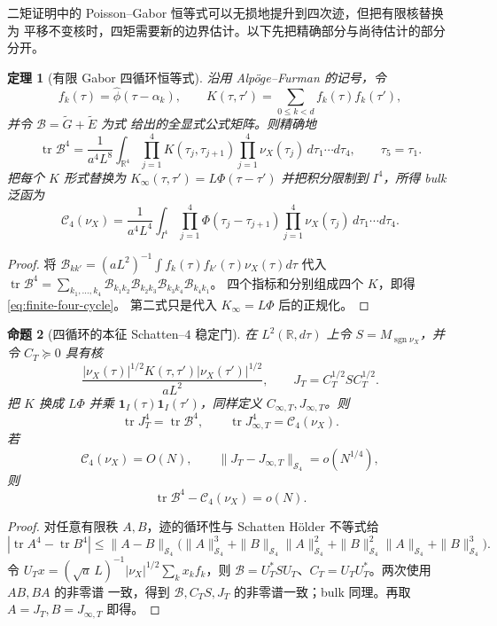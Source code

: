 \documentclass[UTF8,11pt,a4paper]{ctexart}
\newtheorem{theorem}{定理}[section]
\newtheorem{proposition}[theorem]{命题}
\theoremstyle{definition}
\theoremstyle{remark}
\newcommand{\tr}{\operatorname{tr}}
\begin{document}
二矩证明中的 Poisson--Gabor 恒等式可以无损地提升到四次迹，但把有限核替换为
平移不变核时，四矩需要新的边界估计。以下先把精确部分与尚待估计的部分分开。

\begin{theorem}[有限 Gabor 四循环恒等式]\label{thm:gabor-four-cycle}
沿用 Alpöge--Furman \cite[\S2]{AF26} 的记号，令
\[
 f_k(\tau)=\widehat\phi(\tau-\alpha_k),\qquad
 K(\tau,\tau')=\sum_{0\le k<d}f_k(\tau)f_k(\tau'),
\]
并令 $\mathcal B=\widetilde G+\widetilde E$ 为式 \cite[(2.11)]{AF26}
给出的全显式公式矩阵。则精确地
\[
 \tr\mathcal B^4
 =\frac1{a^4L^8}\int_{\mathbb R^4}
 \prod_{j=1}^4K(\tau_j,\tau_{j+1})
 \prod_{j=1}^4\nu_X(\tau_j)\,d\tau_1\cdots d\tau_4,
 \qquad \tau_5=\tau_1.
 \label{eq:finite-four-cycle}
\]
把每个 $K$ 形式替换为
$K_\infty(\tau,\tau')=L\Phi(\tau-\tau')$ 并把积分限制到
$I^4$，所得 bulk 泛函为
\[
 \mathcal C_4(\nu_X)
 =\frac1{a^4L^4}\int_{I^4}
 \prod_{j=1}^4\Phi(\tau_j-\tau_{j+1})
 \prod_{j=1}^4\nu_X(\tau_j)\,d\tau_1\cdots d\tau_4.
 \label{eq:bulk-four-cycle}
\]
\end{theorem}

\begin{proof}
将
$\mathcal B_{kk'}=(aL^2)^{-1}\int f_k(\tau)f_{k'}(\tau)\nu_X(\tau)d\tau$
代入
$\tr\mathcal B^4=\sum_{k_1,\ldots,k_4}
\mathcal B_{k_1k_2}\mathcal B_{k_2k_3}
\mathcal B_{k_3k_4}\mathcal B_{k_4k_1}$。
四个指标和分别组成四个 $K$，即得 \eqref{eq:finite-four-cycle}。
第二式只是代入 $K_\infty=L\Phi$ 后的正规化。
\end{proof}

\begin{proposition}[四循环的本征 Schatten--$4$ 稳定门]\label{prop:s4-gate}
在 $L^2(\mathbb R,d\tau)$ 上令 $S=M_{\operatorname{sgn}\nu_X}$，并令 $C_T\succeq0$
具有核
\[
 \frac{|\nu_X(\tau)|^{1/2}K(\tau,\tau')
 |\nu_X(\tau')|^{1/2}}{aL^2},
 \qquad J_T=C_T^{1/2}SC_T^{1/2}.
\]
把 $K$ 换成 $L\Phi$ 并乘
$\mathbf1_I(\tau)\mathbf1_I(\tau')$，同样定义
$C_{\infty,T},J_{\infty,T}$。则
\[
 \tr J_T^4=\tr\mathcal B^4,\qquad
 \tr J_{\infty,T}^4=\mathcal C_4(\nu_X).
\]
若
\[
 \mathcal C_4(\nu_X)=O(N),\qquad
 \|J_T-J_{\infty,T}\|_{\mathcal S_4}=o(N^{1/4}),
 \label{eq:s4-gate}
\]
则
\[
 \tr\mathcal B^4-\mathcal C_4(\nu_X)=o(N).
\]
\end{proposition}

\begin{proof}
对任意有限秩 $A,B$，迹的循环性与 Schatten Hölder 不等式给
\[
 |\tr A^4-\tr B^4|
 \le\|A-B\|_{\mathcal S_4}
 \bigl(\|A\|_{\mathcal S_4}^3
 +\|B\|_{\mathcal S_4}\|A\|_{\mathcal S_4}^2
 +\|B\|_{\mathcal S_4}^2\|A\|_{\mathcal S_4}
 +\|B\|_{\mathcal S_4}^3\bigr).
\]
令
$U_Tx=(\sqrt{a}\,L)^{-1}|\nu_X|^{1/2}\sum_kx_kf_k$，则
$\mathcal B=U_T^*SU_T$、$C_T=U_TU_T^*$。两次使用 $AB,BA$ 的非零谱
一致，得到 $\mathcal B,C_TS,J_T$ 的非零谱一致；bulk 同理。再取
$A=J_T,B=J_{\infty,T}$ 即得。
\end{proof}
\end{document}
